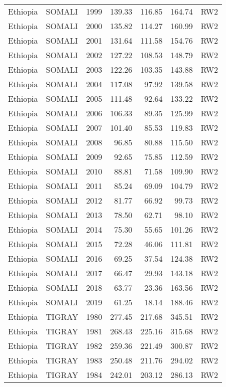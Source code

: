 \begin{longtable}{lllrrrl}
  Ethiopia & SOMALI & 1999 & 139.33 & 116.85 & 164.74 & RW2 \\ 
  Ethiopia & SOMALI & 2000 & 135.82 & 114.27 & 160.99 & RW2 \\ 
  Ethiopia & SOMALI & 2001 & 131.64 & 111.58 & 154.76 & RW2 \\ 
  Ethiopia & SOMALI & 2002 & 127.22 & 108.53 & 148.79 & RW2 \\ 
  Ethiopia & SOMALI & 2003 & 122.26 & 103.35 & 143.88 & RW2 \\ 
  Ethiopia & SOMALI & 2004 & 117.08 & 97.92 & 139.58 & RW2 \\ 
  Ethiopia & SOMALI & 2005 & 111.48 & 92.64 & 133.22 & RW2 \\ 
  Ethiopia & SOMALI & 2006 & 106.33 & 89.35 & 125.99 & RW2 \\ 
  Ethiopia & SOMALI & 2007 & 101.40 & 85.53 & 119.83 & RW2 \\ 
  Ethiopia & SOMALI & 2008 & 96.85 & 80.88 & 115.50 & RW2 \\ 
  Ethiopia & SOMALI & 2009 & 92.65 & 75.85 & 112.59 & RW2 \\ 
  Ethiopia & SOMALI & 2010 & 88.81 & 71.58 & 109.90 & RW2 \\ 
  Ethiopia & SOMALI & 2011 & 85.24 & 69.09 & 104.79 & RW2 \\ 
  Ethiopia & SOMALI & 2012 & 81.77 & 66.92 & 99.73 & RW2 \\ 
  Ethiopia & SOMALI & 2013 & 78.50 & 62.71 & 98.10 & RW2 \\ 
  Ethiopia & SOMALI & 2014 & 75.30 & 55.65 & 101.26 & RW2 \\ 
  Ethiopia & SOMALI & 2015 & 72.28 & 46.06 & 111.81 & RW2 \\ 
  Ethiopia & SOMALI & 2016 & 69.25 & 37.54 & 124.38 & RW2 \\ 
  Ethiopia & SOMALI & 2017 & 66.47 & 29.93 & 143.18 & RW2 \\ 
  Ethiopia & SOMALI & 2018 & 63.77 & 23.36 & 163.56 & RW2 \\ 
  Ethiopia & SOMALI & 2019 & 61.25 & 18.14 & 188.46 & RW2 \\ 
  Ethiopia & TIGRAY & 1980 & 277.45 & 217.68 & 345.51 & RW2 \\ 
  Ethiopia & TIGRAY & 1981 & 268.43 & 225.16 & 315.68 & RW2 \\ 
  Ethiopia & TIGRAY & 1982 & 259.36 & 221.49 & 300.87 & RW2 \\ 
  Ethiopia & TIGRAY & 1983 & 250.48 & 211.76 & 294.02 & RW2 \\ 
  Ethiopia & TIGRAY & 1984 & 242.01 & 203.12 & 286.13 & RW2 \\ 

\end{longtable}
